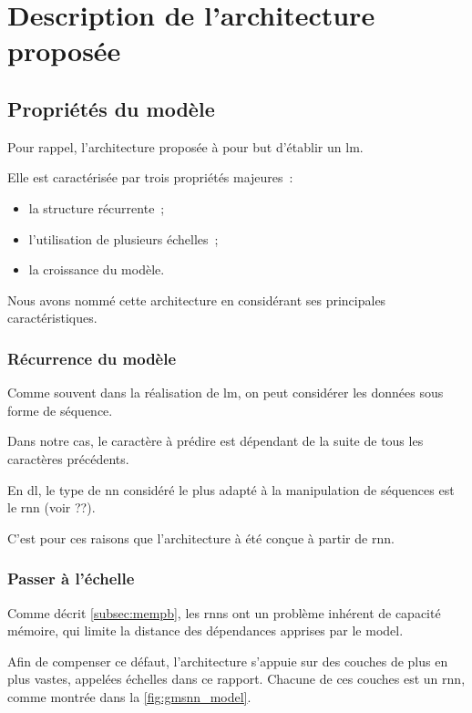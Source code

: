{\chapter{Description de l'architecture proposée}\label{ch:gmsnn_model}
\section{Propriétés du modèle}
Pour rappel, l'architecture proposée à pour but d'établir un \gls{lm}.

Elle est caractérisée par trois propriétés majeures~:
\begin{itemize}
	\item la structure récurrente~;
	\item l'utilisation de plusieurs échelles~;
	\item la croissance du modèle.
\end{itemize}

Nous avons nommé cette architecture  en considérant ses principales caractéristiques.

\subsection{Récurrence du modèle}
Comme souvent dans la réalisation de \gls{lm}, on peut considérer les données sous forme de séquence.

Dans notre cas, le caractère à prédire est dépendant de la suite de tous les caractères précédents.

En \gls{dl}, le type de \gls{nn} considéré le plus adapté à la manipulation de séquences est le \gls{rnn} (voir ??). %

C'est pour ces raisons que l'architecture à été conçue à partir de \gls{rnn}.

\subsection{Passer à l'échelle}\label{subsec:scaling}
Comme décrit \autoref{subsec:mempb}, les \glspl{rnn} ont un problème inhérent de capacité mémoire, qui limite la distance des dépendances apprises par le \gls{model}.

Afin de compenser ce défaut, l'architecture  s'appuie sur des couches de plus en plus vastes, appelées \og échelles\fg{} dans ce rapport.
Chacune de ces couches est un \gls{rnn}, comme montrée dans la \autoref{fig:gmsnn_model}.

}
